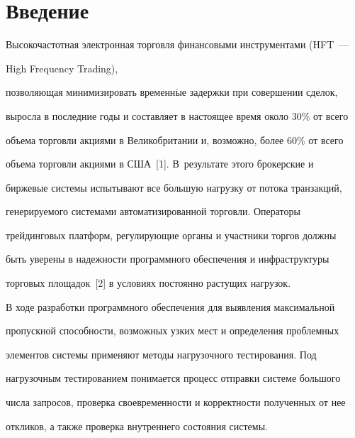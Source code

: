 







      \thispagestyle{headings}








\section{Введение}





  Высокочастотная электронная торговля финансовыми инструментами (HFT~---


  High Frequency Trading),


позволяющая минимизировать временн$\acute{\mbox{ы}}$е задержки при совершении сделок,


выросла в последние годы и составляет в настоящее время около 30\% от всего


объема торговли акциями в Великобритании и, возможно, более 60\% от всего


объема торговли акциями в США~[1]. В~результате этого брокерские и


биржевые системы испытывают все б$\acute{\mbox{о}}$льшую нагрузку от потока транзакций,


генерируемого системами автоматизированной торговли. Операторы


трейдинговых платформ, регулирующие органы и участники торгов должны


быть уверены в надежности программного обеспечения и инфраструктуры


торговых площадок~[2] в условиях постоянно растущих нагрузок.





  В ходе разработки программного обеспечения для выявления максимальной


пропускной способности, возможных узких мест и определения проблемных


элементов системы применяют методы нагрузочного тестирования. Под


нагрузочным тестированием понимается процесс отправки системе большого


числа запросов, проверка своевременности и корректности полученных от нее


откликов, а также проверка внутреннего состояния системы.





